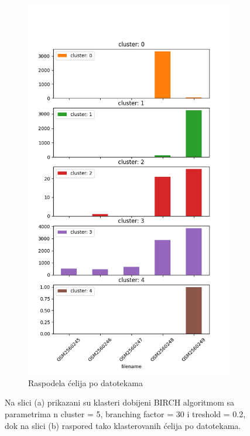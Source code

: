\documentclass[a4paper]{article}
\begin{document}
\begin{figure}[H]
\begin{subfigure}{0.5\textwidth}
    \includegraphics[width=\textwidth]{bar_birch_clustering}
	\caption{Raspodela ćelija po datotekama}
	\label{bar_birch_clustering}
	\end{subfigure}
	\caption{Na slici (a) prikazani su klasteri dobijeni BIRCH algoritmom sa parametrima n cluster = 5, branching factor = 30 i treshold = 0.2, dok na slici (b) raspored tako klasterovanih ćelija po datotekama.}
\end{figure}
\end{document}
